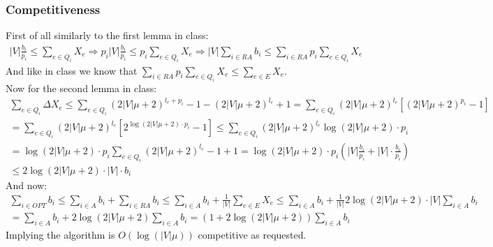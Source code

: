\documentclass{article}
\begin{document}
\subsubsection*{Competitiveness}
First of all similarly to the first lemma in class:
\begin{gather*}
|V|\frac{b_i}{p_i} \leq \sum_{e\in Q_i}X_e
\Rightarrow p_i|V|\frac{b_i}{p_i} \leq p_i \sum_{e\in Q_i}X_e
\Rightarrow |V|\sum_{i\in RA}b_i \leq  \sum_{i\in RA} p_i \sum_{e\in Q_i} X_e
\end{gather*}
And like in class we know that $\sum_{i\in RA} p_i \sum_{e\in Q_i} X_e \leq \sum_{e\in E}X_e$.\\
Now for the second lemma in class:
\begin{gather*}
\sum_{e\in Q_i}\Delta X_e \leq  \sum_{e\in Q_i} (2|V|\mu + 2)^{l_e + p_i} - 1 -(2|V|\mu + 2)^{l_e} + 1 =
\sum_{e\in Q_i}(2|V|\mu + 2)^{l_e}[(2|V|\mu + 2)^{p_i} - 1] \\
= \sum_{e\in Q_i}(2|V|\mu + 2)^{l_e}\left[2^{\log(2|V|\mu + 2) \cdot p_i} - 1\right] \leq 
\sum_{e\in Q_i}(2|V|\mu + 2)^{l_e}\log(2|V|\mu + 2) \cdot p_i \\
= \log(2|V|\mu + 2) \cdot p_i \sum_{e\in Q_i}(2|V|\mu + 2)^{l_e} - 1 + 1
= \log(2|V|\mu + 2) \cdot p_i (|V|\frac{b_i}{p_i} + |V|\cdot \frac{b_i}{p_i}) \\
\leq 2\log(2|V|\mu + 2) \cdot|V|\cdot b_i
\end{gather*}
And now:
\begin{gather*}
\sum_{i\in OPT}b_i \leq \sum_{i\in A}b_i + \sum_{i\in RA}b_i \leq
\sum_{i\in A}b_i + \frac{1}{|V|} \sum_{e\in E} X_e \leq 
\sum_{i\in A}b_i + \frac{1}{|V|} 2\log(2|V|\mu + 2) \cdot|V| \sum_{i\in A} b_i \\
= \sum_{i\in A}b_i + 2\log(2|V|\mu + 2) \sum_{i\in A} b_i
= (1 + 2\log(2|V|\mu + 2)) \sum_{i\in A} b_i
\end{gather*}
Implying the algorithm is $O(\log(|V|\mu))$ competitive as requested.
\end{document}
